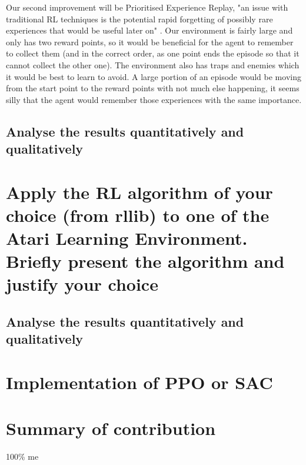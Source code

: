 \documentclass[a4pape, 11pt, english]{article}
\begin{document}
Our second improvement will be Prioritised Experience Replay, "an issue with traditional RL techniques is the potential rapid forgetting of possibly rare experiences that would be useful later on" \citep[p 1]{schaul_prioritized_2015}. Our environment is fairly large and only has two reward points, so it would be beneficial for the agent to remember to collect them (and in the correct order, as one point ends the episode so that it cannot collect the other one). The environment also has traps and enemies which it would be best to learn to avoid. A large portion of an episode would be moving from the start point to the reward points with not much else happening, it seems silly that the agent would remember those experiences with the same importance.

\subsection{Analyse the results quantitatively and qualitatively}

\section{Apply the RL algorithm of your choice (from rllib) to one of the Atari Learning Environment. Briefly present the algorithm and justify your choice}

\subsection{Analyse the results quantitatively and qualitatively}

\section{Implementation of PPO or SAC}

\section{Summary of contribution}
100\% me


\end{document}
